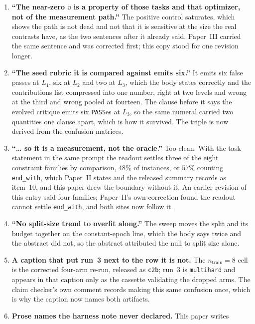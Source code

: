 \documentclass[11pt]{article}
\begin{document}
\begin{enumerate}
    $p_0$ rather than identified as caused by it. The abstract then said the answer tracks
    $p_0$, a claim entry~49 withdraws.
  \item \textbf{``The near-zero $\dd$ is a property of those tasks and that optimizer, not of
    the measurement path.''} The positive control saturates, which shows the path is not dead
    and not that it is sensitive at the size the real contrasts have, as the two sentences after
    it already said. Paper~III carried the same sentence and was corrected first; this copy
    stood for one revision longer.
  \item \textbf{``The seed rubric it is compared against emits six.''} It emits six false
    passes at $L_1$, six at $L_2$ and two at $L_3$, which the body states correctly and the
    contributions list compressed into one number, right at two levels and wrong at the third and
    wrong pooled at fourteen. The clause before it says the evolved critique emits six
    \texttt{PASS}es at $L_3$, so the same numeral carried two quantities one clause apart, which
    is how it survived. The triple is now derived from the confusion matrices.
  \item \textbf{``\dots{} so it is a measurement, not the oracle.''} Too clean. With the task
    statement in the same prompt the readout settles three of the eight constraint families by
    comparison, $48\%$ of instances, or $57\%$ counting \texttt{end\_with}, which Paper~II
    states and the released summary records as item~10, and this paper drew the boundary without
    it. An earlier revision of this entry said four families; Paper~II's own correction found the
    readout cannot settle \texttt{end\_with}, and both sites now follow it.
  \item \textbf{``No split-size trend to overfit along.''} The sweep moves the split and its
    budget together on the constant-epoch line, which the body says twice and the abstract did
    not, so the abstract attributed the null to split size alone.
  \item \textbf{A caption that put run~3 next to the row it is not.} The
    $n_{\mathrm{train}}{=}8$ cell is the corrected four-arm re-run, released as \texttt{c2b};
    run~3 is \texttt{multihard} and appears in that caption only as the cassette validating the
    dropped arms. The claim checker's own comment records making this same confusion once, which
    is why the caption now names both artifacts.
  \item \textbf{Prose names the harness note never declared.} This paper writes

\end{enumerate}
\end{document}
